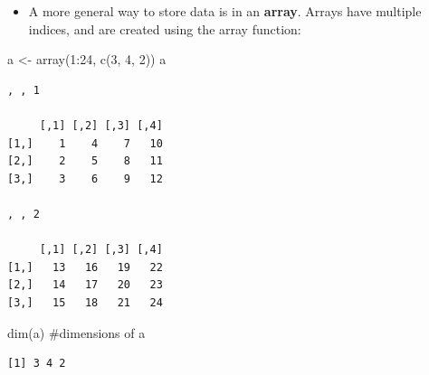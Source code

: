 \documentclass[
  9pt,
  a4paper,
  ignorenonframetext,
  notheorems]{beamer}
\newenvironment{Shaded}{\begin{snugshade}}{\end{snugshade}}
\newcommand{\CommentTok}[1]{\textcolor[rgb]{0.37,0.37,0.37}{#1}}
\newcommand{\DecValTok}[1]{\textcolor[rgb]{0.68,0.00,0.00}{#1}}
\newcommand{\FunctionTok}[1]{\textcolor[rgb]{0.28,0.35,0.67}{#1}}
\newcommand{\NormalTok}[1]{\textcolor[rgb]{0.00,0.23,0.31}{#1}}
\newcommand{\OtherTok}[1]{\textcolor[rgb]{0.00,0.23,0.31}{#1}}
\newcommand{\SpecialCharTok}[1]{\textcolor[rgb]{0.37,0.37,0.37}{#1}}
\providecommand{\tightlist}{%
  \setlength{\itemsep}{0pt}\setlength{\parskip}{0pt}}\usepackage{longtable,booktabs,array}
\begin{document}
\begin{frame}[fragile]
\begin{itemize}
\tightlist
\item
  A more general way to store data is in an \textbf{array}. Arrays have
  multiple indices, and are created using the array function:
\end{itemize}

\begin{Shaded}
\begin{Highlighting}[]
\NormalTok{a }\OtherTok{\textless{}{-}} \FunctionTok{array}\NormalTok{(}\DecValTok{1}\SpecialCharTok{:}\DecValTok{24}\NormalTok{, }\FunctionTok{c}\NormalTok{(}\DecValTok{3}\NormalTok{, }\DecValTok{4}\NormalTok{, }\DecValTok{2}\NormalTok{)) }
\NormalTok{a}
\end{Highlighting}
\end{Shaded}

\begin{verbatim}
, , 1

     [,1] [,2] [,3] [,4]
[1,]    1    4    7   10
[2,]    2    5    8   11
[3,]    3    6    9   12

, , 2

     [,1] [,2] [,3] [,4]
[1,]   13   16   19   22
[2,]   14   17   20   23
[3,]   15   18   21   24
\end{verbatim}

\begin{Shaded}
\begin{Highlighting}[]
\FunctionTok{dim}\NormalTok{(a) }\CommentTok{\#dimensions of a}
\end{Highlighting}
\end{Shaded}

\begin{verbatim}
[1] 3 4 2
\end{verbatim}
\end{frame}
\end{document}
